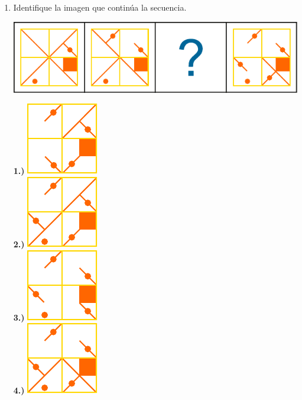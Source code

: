 \documentclass[11pt, a4paper]{article} %
\theoremstyle{dotlessP}
\theoremstyle{dotlessS}
\begin{document}
\begin{enumerate}[label=\color{dg}\theenumi.]
   \item {\color{db} Identifique la imagen que continúa  la secuencia. 
        }
         \begin{center}
    \includegraphics[scale=1]{Figuras/132_1.pdf}
    \end{center}
    {\color{dh} \textbf{1.)} }   
	\includegraphics[scale=0.1]{Figuras/132_2-1.pdf}\\
          {\color{dh} \textbf{2.)} }   
    \includegraphics[scale=0.1]{Figuras/132_2-2.pdf}\\
          {\color{dh} \textbf{3.)} }   
    \includegraphics[scale=0.1]{Figuras/132_2-3.pdf}\\
          {\color{dh} \textbf{4.)} }   
    \includegraphics[scale=0.1]{Figuras/132_2-4.pdf}
\end{enumerate}

\end{document}
